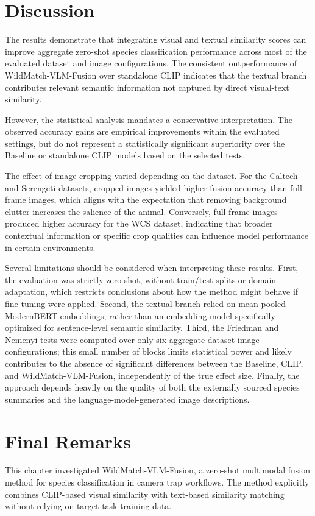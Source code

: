 \section{Discussion}
The results demonstrate that integrating visual and textual similarity scores can improve aggregate zero-shot species classification performance across most of the evaluated dataset and image configurations. The consistent outperformance of WildMatch-VLM-Fusion over standalone CLIP indicates that the textual branch contributes relevant semantic information not captured by direct visual-text similarity.

However, the statistical analysis mandates a conservative interpretation. The observed accuracy gains are empirical improvements within the evaluated settings, but do not represent a statistically significant superiority over the Baseline or standalone CLIP models based on the selected tests.

The effect of image cropping varied depending on the dataset. For the Caltech and Serengeti datasets, cropped images yielded higher fusion accuracy than full-frame images, which aligns with the expectation that removing background clutter increases the salience of the animal. Conversely, full-frame images produced higher accuracy for the WCS dataset, indicating that broader contextual information or specific crop qualities can influence model performance in certain environments.

Several limitations should be considered when interpreting these results. First, the evaluation was strictly zero-shot, without train/test splits or domain adaptation, which restricts conclusions about how the method might behave if fine-tuning were applied. Second, the textual branch relied on mean-pooled ModernBERT embeddings, rather than an embedding model specifically optimized for sentence-level semantic similarity. Third, the Friedman and Nemenyi tests were computed over only six aggregate dataset-image configurations; this small number of blocks limits statistical power and likely contributes to the absence of significant differences between the Baseline, CLIP, and WildMatch-VLM-Fusion, independently of the true effect size. Finally, the approach depends heavily on the quality of both the externally sourced species summaries and the language-model-generated image descriptions.

\section{Final Remarks}
This chapter investigated WildMatch-VLM-Fusion, a zero-shot multimodal fusion method for species classification in camera trap workflows. The method explicitly combines CLIP-based visual similarity with text-based similarity matching without relying on target-task training data.

